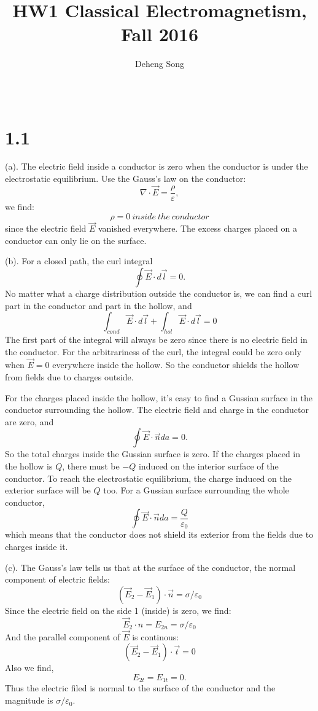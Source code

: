 \documentclass{article}
\title{HW1 Classical Electromagnetism, Fall 2016}
\author{Deheng Song}
\date{\ }
\begin{document}
  \maketitle
  \section*{1.1}
  (a). The electric field inside a conductor is zero when the conductor is under the electrostatic equilibrium. Use the Gauss's law on the
  conductor:
  \[ \nabla\cdot\vec E =\frac{\rho}{\varepsilon}, \]
  we find:
  \[ \rho=0\ inside\ the \ conductor\]
  since the electric field $\vec E$ vanished everywhere. The excess charges placed on a conductor can only lie on the surface.\par
  $~$\\
  (b). For a closed path, the curl integral
  \[ \oint\vec E\cdot d\vec l=0. \]
  No matter what a charge distribution outside the conductor is, we can find a curl part in the conductor and part in the hollow, and
  \[\int_{cond} \vec E\cdot d\vec l+\int_{hol} \vec E\cdot d\vec l=0 \]
  The first part of the integral will always be zero since there is no electric field in the conductor. For the arbitrariness of the
  curl, the integral could be zero only when $\vec E=0$ everywhere inside the hollow. So the conductor shields the hollow from fields due to charges
  outside.\par
  For the charges placed inside the hollow, it's easy to find a Gussian surface in the conductor surrounding the hollow. The electric
  field and charge in the conductor are zero, and
  \[\oint \vec{E}\cdot\vec{n}da=0. \]
  So the total charges inside the Gussian surface is zero. If the charges placed in the hollow is $Q$, there must be $-Q$ induced on the
  interior surface of the conductor. To reach the electrostatic equilibrium, the charge induced on the exterior surface will be $Q$ too.
  For a Gussian surface surrounding the whole conductor,
  \[ \oint\vec E\cdot\vec nda=\frac{Q}{\varepsilon_0} \]
  which means that the conductor does not shield its exterior from the fields due to charges inside it.
  \par
  $~$\\
  (c). The Gauss's law tells us that at the surface of the conductor, the normal component of electric fields:
  \[(\vec{E}_2-\vec{E}_1)\cdot \vec n=\sigma/\varepsilon_0 \]
  Since the electric field on the side 1 (inside) is zero, we find:
  \[\vec{E}_2\cdot n =E_{2n}=\sigma/\varepsilon_0 \]
  And the parallel component of $\vec{E}$ is continous:
  \[ (\vec{E}_2-\vec{E}_1)\cdot\vec{t}=0\]
  Also we find,
  \[ E_{2t}=E_{1t}=0.\]
  Thus the electric filed is normal to the surface of the conductor and the magnitude is $\sigma/\varepsilon_0$.
  \pagebreak
\end{document}
